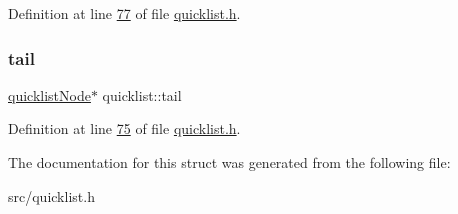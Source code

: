 Definition at line \hyperlink{quicklist_8h_source_l00077}{77} of file \hyperlink{quicklist_8h_source}{quicklist.\+h}.

\mbox{\label{structquicklist_af78900edba2a2d2f83599c362f0bc1b0}} 
\subsubsection{\texorpdfstring{tail}{tail}}
{\footnotesize\ttfamily \hyperlink{structquicklistNode}{quicklist\+Node}$\ast$ quicklist\+::tail}



Definition at line \hyperlink{quicklist_8h_source_l00075}{75} of file \hyperlink{quicklist_8h_source}{quicklist.\+h}.



The documentation for this struct was generated from the following file\+:\begin{DoxyCompactItemize}
\item 
src/quicklist.\+h\end{DoxyCompactItemize}
